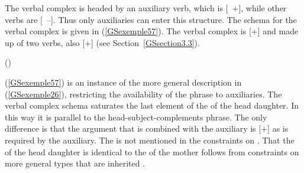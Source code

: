 The verbal complex is headed by an auxiliary verb, which is [\aux~$+$], while other verbs are [\aux~$–$].  Thus only auxiliaries can enter this structure. The schema for the verbal complex is given in (\ref{GSexemple57}). The verbal complex is [\light{}$+$] and made up of two verbs, also [\light{}$+$] (see Section~\ref{GSsection3.3}). 


\eas 
\label{GSexemple57}%
 () \impl \\
\zs


\noindent
(\ref{GSexemple57}) is an instance of the more general description in (\ref{GSexemple26}), restricting the 	availability of the phrase to auxiliaries. The verbal complex schema saturates the last element of the \compsl of the head daughter. In this way it is parallel to the head-subject-complements phrase. The only difference is that the argument
that is combined with the auxiliary is [\light{}$+$] as is required by the auxiliary. The \subjl is not mentioned in the constraints on . That the \subjv of the head daughter is identical to the \subjv of the mother follows from constraints on more general types that are inherited \crossrefchapterp[\page \pageref{prop:valence-principle}]{properties}. 



